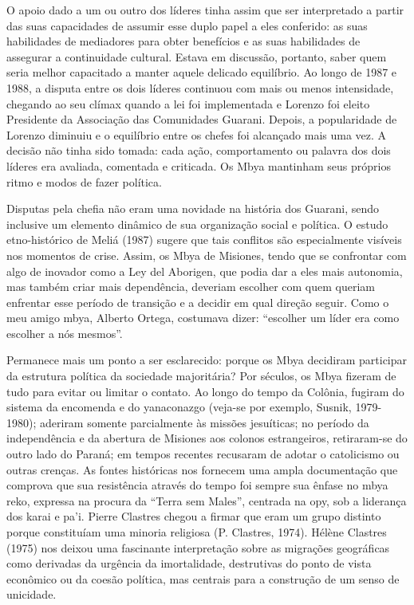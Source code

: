 O apoio dado a um ou outro dos líderes tinha assim que ser interpretado
a partir das suas capacidades de assumir esse duplo papel a eles
conferido: as suas habilidades de mediadores para obter benefícios e as
suas habilidades de assegurar a continuidade cultural. Estava em
discussão, portanto, saber quem seria melhor capacitado a manter aquele
delicado equilíbrio. Ao longo de 1987 e 1988, a disputa entre os dois
líderes continuou com mais ou menos intensidade, chegando ao seu clímax
quando a lei foi implementada e Lorenzo foi eleito Presidente da
Associação das Comunidades Guarani. Depois, a popularidade de Lorenzo
diminuiu e o equilíbrio entre os chefes foi alcançado mais uma vez. A
decisão não tinha sido tomada: cada ação, comportamento ou palavra dos
dois líderes era avaliada, comentada e criticada. Os Mbya mantinham
seus próprios ritmo e modos de fazer política. 

Disputas pela chefia não eram uma novidade na história dos Guarani,
sendo inclusive um elemento dinâmico de sua organização social e
política. O estudo etno-histórico de Meliá (1987) sugere que tais
conflitos são especialmente visíveis nos momentos de crise. Assim, os
Mbya de Misiones, tendo que se confrontar com algo de inovador como a
Ley del Aborigen, que podia dar a eles mais autonomia, mas também criar
mais dependência, deveriam escolher com quem queriam enfrentar esse
período de transição e a decidir em qual direção seguir. Como o meu
amigo mbya, Alberto Ortega, costumava dizer: ``escolher um líder era
como escolher a nós mesmos''.

Permanece mais um ponto a ser esclarecido: porque os Mbya decidiram
participar da estrutura política da sociedade majoritária? Por séculos,
os Mbya fizeram de tudo para evitar ou limitar o contato. Ao longo do
tempo da Colônia, fugiram do sistema da encomenda e do yanaconazgo
(veja-se por exemplo, Susnik, 1979-1980); aderiram somente parcialmente
às missões jesuíticas; no período da independência e da abertura de
Misiones aos colonos estrangeiros, retiraram-se do outro lado do
Paraná; em tempos recentes recusaram de adotar o catolicismo ou outras
crenças. As fontes históricas nos fornecem uma ampla documentação que
comprova que sua resistência através do tempo foi sempre sua ênfase no
mbya reko, expressa na procura da ``Terra sem Males'', centrada na opy,
sob a liderança dos karai e pa’i. Pierre Clastres chegou a firmar que
eram um grupo distinto porque constituíam uma minoria religiosa (P.
Clastres, 1974). Hélène Clastres (1975) nos deixou uma fascinante
interpretação sobre as migrações geográficas como derivadas da urgência
da imortalidade, destrutivas do ponto de vista econômico ou da coesão
política, mas centrais para a construção de um senso de unicidade. 

